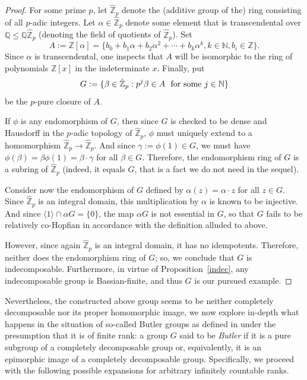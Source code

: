 \documentclass[12pt]{amsart}
\theoremstyle{definition}
\def\Z{{\mathbb Z}}
\def\Q{{\mathbb Q}}
\def\N{{\mathbb N}}
\begin{document}
\begin{proof}
For some prime $p$, let $\hat \Z_p$ denote the (additive group of the) ring consisting of all $p$-adic integers. Let $\alpha\in \hat\Z_p$ denote some element that is transcendental over $\Q\leq \Q\hat \Z_p$ (denoting the field of quotients of $\hat \Z_p$). Set
$$
            A:=\Z[\alpha]=\{b_0+b_1\alpha +b_2\alpha^2 +\cdots + b_k \alpha^k, k\in \N, b_i\in \Z\}.
$$
Since $\alpha$ is transcendental, one inspects that $A$ will be isomorphic to the ring of polynomials $\Z[x]$ in the indeterminate $x$.
Finally, put
$$
            G:=\{\beta\in \hat\Z_p: p^j \beta \in A\ \ {\rm for\ some\ }j\in \N\}
$$
be the $p$-pure closure of $A$.

If $\phi$ is any endomorphism of $G$, then since $G$ is checked to be dense and Hausdorff in the $p$-adic topology of $\hat \Z_p$, $\phi$ must uniquely extend to a homomorphism $\hat \Z_p\to \hat \Z_p$. And since $\gamma:=\phi(1)\in G$, we must have $\phi(\beta)=\beta\phi(1)=\beta\cdot \gamma$ for all $\beta\in G$. Therefore, the endomorphism ring of $G$ is a subring of $\hat \Z_p$ (indeed, it equals $G$, that is a fact we do not need in the sequel).

Consider now the endomorphism of $G$ defined by $\alpha(z)=\alpha \cdot z$ for all $z\in G$. Since $\hat \Z_p$ is an integral domain, this multiplication by $\alpha$ is known to be injective. And since $\langle 1\rangle \cap \alpha G=\{0\}$, the map $\alpha G$ is not essential in $G$, so that $G$ fails to be relatively co-Hopfian in accordance with the definition alluded to above.

However, since again $\hat \Z_p$ is an integral domain, it has no idempotents. Therefore, neither does the endomorphism ring of $G$; so, we conclude that $G$ is indecomposable. Furthermore, in virtue of Proposition~\ref{indec}, any indecomposable group is Bassian-finite, and thus $G$ is our pursued example.
\end{proof}

Nevertheless, the constructed above group seems to be neither completely decomposable nor its proper homomorphic image, we now explore in-depth what happens in the situation of so-called Butler groups as defined in \cite{Fu} under the presumption that it is of finite rank: a group $G$ said to be {\it Butler} if it is a pure subgroup of a completely decomposable group or, equivalently, it is an epimorphic image of a completely decomposable group. Specifically, we proceed with the following possible expansions for arbitrary infinitely countable ranks.
\end{document}
